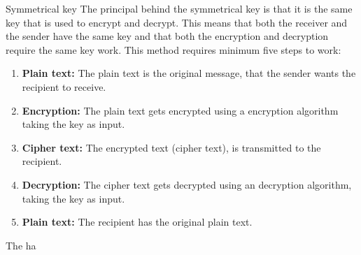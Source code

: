 Symmetrical key
The principal behind the symmetrical key is that it is the same key that is used to encrypt and decrypt. This means that both the receiver and the sender have the same key and that both the encryption and decryption require the same key work. This method requires minimum five steps to work:
\begin{enumerate}
\item \textbf{Plain text:} The plain text is the original message, that the sender wants the recipient to receive.
\item \textbf{Encryption:} The plain text gets encrypted using a encryption algorithm taking the key as input.
\item \textbf{Cipher text:} The encrypted text (cipher text), is transmitted to the recipient.
\item \textbf{Decryption:} The cipher text gets decrypted using an decryption algorithm, taking the key as input.
\item \textbf{Plain text:} The recipient has the original plain text.
\end{enumerate}

The ha

% 